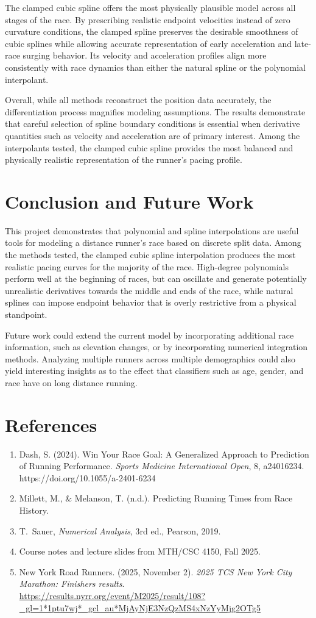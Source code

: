 \documentclass[12pt]{article}
\begin{document}
The clamped cubic spline offers the most physically plausible model across all stages of the race. By prescribing realistic endpoint velocities instead of zero curvature conditions, the clamped spline preserves the desirable smoothness of cubic splines while allowing accurate representation of early acceleration and late-race surging behavior. Its velocity and acceleration profiles align more consistently with race dynamics than either the natural spline or the polynomial interpolant.

Overall, while all methods reconstruct the position data accurately, the differentiation process magnifies modeling assumptions. The results demonstrate that careful selection of spline boundary conditions is essential when derivative quantities such as velocity and acceleration are of primary interest. Among the interpolants tested, the clamped cubic spline provides the most balanced and physically realistic representation of the runner's pacing profile.

\section{Conclusion and Future Work}
This project demonstrates that polynomial and spline interpolations are useful tools for modeling a distance runner's race based on discrete split data. Among the methods tested, the clamped cubic spline interpolation produces the most realistic pacing curves for the majority of the race. High-degree polynomials perform well at the beginning of races, but can oscillate and generate potentially unrealistic derivatives towards the middle and ends of the race, while natural splines can impose endpoint behavior that is overly restrictive from a physical standpoint.

Future work could extend the current model by incorporating additional
race information, such as elevation changes, or by incorporating numerical
integration methods. Analyzing multiple runners across multiple demographics could also yield interesting insights as to the effect that classifiers such as age, gender, and race have on long distance running.

\newpage
\section*{References}
\begin{enumerate}
\item Dash, S. (2024). Win Your Race Goal: A Generalized Approach to Prediction of Running Performance. \textit{Sports Medicine International Open}, 8, a24016234. https://doi.org/10.1055/a-2401-6234
\item Millett, M., \& Melanson, T. (n.d.). Predicting Running Times from Race History.
\item T.~Sauer, \emph{Numerical Analysis}, 3rd ed., Pearson, 2019.
\item Course notes and lecture slides from MTH/CSC 4150, Fall 2025.
\item New York Road Runners. (2025, November 2). \textit{2025 TCS New York City Marathon: Finishers results}. \url{https://results.nyrr.org/event/M2025/result/108?_gl=1*1ptu7wj*_gcl_au*MjAyNjE3NzQzMS4xNzYyMjg2OTg5}
\end{enumerate}
\end{document}
